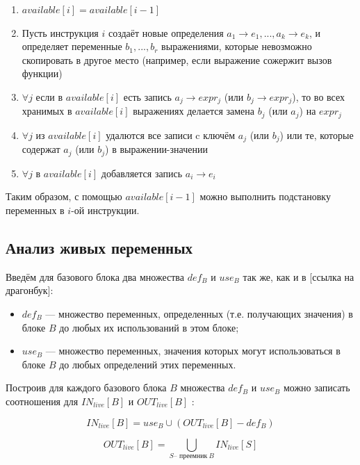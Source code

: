 \documentclass{article}
\begin{document}
\begin{enumerate}
    \item $available[i] = available[i-1]$
    \item Пусть инструкция $i$ создаёт новые определения $a_1 \rightarrow e_1, ..., a_k \rightarrow e_k$, и определяет переменные $b_1, ..., b_r$ выражениями, которые невозможно скопировать в другое место (например, если выражение сожержит вызов функции)
    \item $\forall j$ если в $available[i]$ есть запись $a_j \rightarrow expr_j$ (или $b_j \rightarrow expr_j$), то во всех хранимых в $available[i]$ выражениях делается замена $b_j$ (или $a_j$) на $expr_j$
    \item $\forall j$ из $available[i]$ удалются все записи c ключём $a_j$ (или $b_j$) или те, которые содержат $a_j$ (или $b_j$) в выражении-значении 
    \item $\forall j$ в $available[i]$ добавляется запись $a_i \rightarrow e_i$
\end{enumerate}


Таким образом, с помощью $available[i-1]$ можно выполнить подстановку переменных в $i$-ой инструкции. 


\subsection{Анализ живых переменных}

Введём для базового блока два множества $def_B$ и $use_B$ так же, как и в [ссылка на драгонбук]:

\begin{itemize}
    \item $def_B$ — множество переменных, определенных (т.е. получающих значения) в блоке $B$ до любых их использований в этом блоке;
    \item $use_B$ — множество переменных, значения которых могут использоваться
    в блоке $B$ до любых определений этих переменных.
\end{itemize}

Построив для каждого базового блока $B$ множества $def_B$ и $use_B$ можно записать соотношения для $IN_{live}[B]$ и $OUT_{live}[B]$ \cite[734]{dragonbook}:

\begin{equation*}
    IN_{live}[B] = use_B \cup  ( OUT_{live}[B] - def_B )
\end{equation*}

\begin{equation*}
    OUT_{live}[B] = \bigcup_{S\text{-- преемник}\ B} IN_{live}[S]
\end{equation*}
\end{document}
